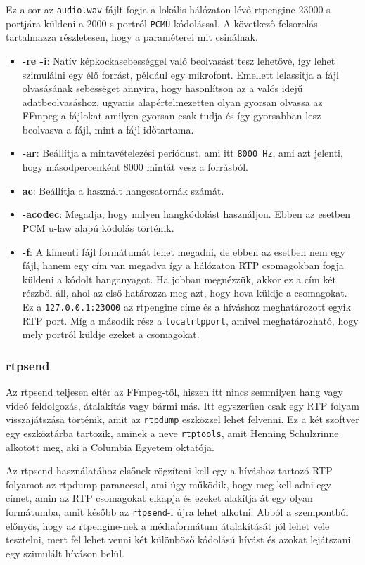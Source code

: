 Ez a sor az \texttt{audio.wav} fájlt fogja a lokális hálózaton lévő rtpengine 23000-s
portjára küldeni a 2000-s portról \texttt{PCMU} kódolással. A következő felsorolás 
tartalmazza részletesen, hogy a paraméterei mit csinálnak.

\begin{itemize}
	\item \textbf{-re -i}: Natív képkockasebességgel való beolvasást tesz lehetővé, 
	így lehet szimulálni egy élő forrást, például egy mikrofont. Emellett lelassítja
	a fájl olvasásának sebességet annyira, hogy hasonlítson az a valós idejű
	adatbeolvasáshoz, ugyanis alapértelmezetten olyan gyorsan olvassa az FFmpeg a
	fájlokat amilyen gyorsan csak tudja és így gyorsabban lesz beolvasva a fájl,
	mint a fájl időtartama. 
	\item \textbf{-ar}: Beállítja a mintavételezési periódust, ami itt \texttt{8000 Hz}, 
	ami azt jelenti, hogy másodpercenként 8000 mintát vesz a forrásból. 
	\item \textbf{ac}: Beállítja a használt hangcsatornák számát.
	\item \textbf{-acodec}: Megadja, hogy milyen hangkódolást használjon. Ebben az 
	esetben PCM u-law alapú kódolás történik.
	\item \textbf{-f}: A kimenti fájl formátumát lehet megadni, de ebben az esetben
	nem egy fájl, hanem egy cím van megadva így a hálózaton RTP csomagokban fogja 
	küldeni a kódolt hanganyagot. Ha jobban megnézzük, akkor ez a cím két részből áll,
	ahol az első határozza meg azt, hogy hova küldje a csomagokat. Ez a 
	\texttt{127.0.0.1:23000} az rtpengine címe és a híváshoz meghatározott egyik RTP
	port. Míg a második rész a \texttt{localrtpport}, amivel meghatározható, hogy
	mely portról küldje ezeket a csomagokat.
\end{itemize}

\subsubsection{rtpsend}

Az rtpsend \cite{rtpsend} teljesen eltér az FFmpeg-től, hiszen itt nincs semmilyen hang 
vagy videó feldolgozás, átalakítás vagy bármi más. Itt egyszerűen csak egy RTP folyam 
visszajátszása történik, amit az \texttt{rtpdump} eszközzel lehet felvenni. Ez a két 
szoftver egy eszköztárba tartozik, aminek a neve \texttt{rtptools}, amit Henning 
Schulzrinne alkotott meg, aki a Columbia Egyetem oktatója.

Az rtpsend használatához elsőnek rögzíteni kell egy a híváshoz tartozó RTP folyamot az 
rtpdump paranccsal, ami úgy működik, hogy meg kell adni egy címet, amin az RTP csomagokat 
elkapja és ezeket alakítja át egy olyan formátumba, amit később az \texttt{rtpsend}-l újra
lehet alkotni. Abból a szempontból előnyös, hogy az rtpengine-nek a médiaformátum
átalakítását jól lehet vele tesztelni, mert fel lehet venni két különböző kódolású
hívást és azokat lejátszani egy szimulált híváson belül.

